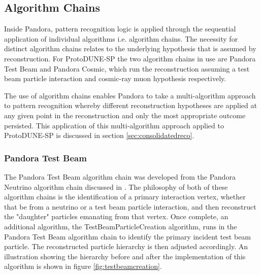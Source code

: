 \subsection{Algorithm Chains}
\label{sec:algchains}
Inside Pandora, pattern recognition logic is applied through the sequential application of individual algorithms i.e. algorithm chains.  The necessity for distinct algorithm chains relates to the underlying hypothesis that is assumed by reconstruction.  For ProtoDUNE-SP the two algorithm chains in use are Pandora Test Beam and Pandora Cosmic, which run the reconstruction assuming a test beam particle interaction and cosmic-ray muon hypothesis respectively.

The use of algorithm chains enables Pandora to take a multi-algorithm approach to pattern recognition whereby different reconstruction hypotheses are applied at any given point in the reconstruction and only the most appropriate outcome persisted.  This application of this multi-algorithm approach applied to ProtoDUNE-SP is discussed in section \ref{sec:consolidatedreco}.

\subsubsection{Pandora Test Beam}
The Pandora Test Beam algorithm chain was developed from the Pandora Neutrino algorithm chain discussed in \cite{pandorauboone}.  The philosophy of both of these algorithm chains is the identification of a primary interaction vertex, whether that be from a neutrino or a test beam particle interaction, and then reconstruct the "daughter" particles emanating from that vertex.  Once complete, an additional algorithm, the TestBeamParticleCreation algorithm, runs in the Pandora Test Beam algorithm chain to identify the primary incident test beam particle.  The reconstructed particle hierarchy is then adjusted accordingly.  An illustration showing the hierarchy before and after the implementation of this algorithm is shown in figure \ref{fig:testbeamcreation}.

